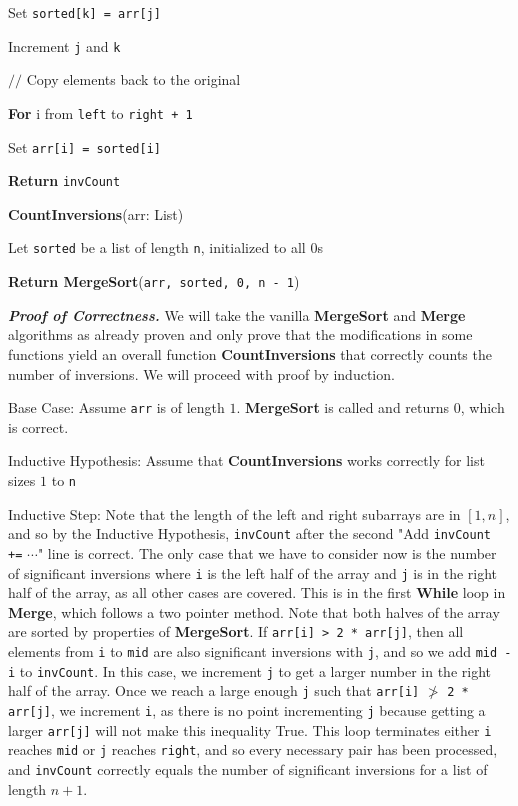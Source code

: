 \documentclass[11pt]{article}
\begin{document}
\begin{enumerate}[leftmargin=*,start=0]
\hspace{15mm} Set \verb|sorted[k] = arr[j]|

\hspace{15mm} Increment \verb|j| and \verb|k|

\hspace{5mm} $//$ Copy elements back to the original

\hspace{5mm} \textbf{For} i from \verb|left| to \verb|right + 1|

\hspace{10mm} Set \verb|arr[i] = sorted[i]|

\hspace{5mm} \textbf{Return} \verb|invCount|

\hfill

\textbf{CountInversions}(arr: List)

\hspace{5mm} Let \verb|sorted| be a list of length \verb|n|, initialized to all $0$s

\hspace{5mm} \textbf{Return MergeSort}(\verb|arr, sorted, 0, n - 1|)

\hfill

\textbf{\textit{Proof of Correctness.}} We will take the vanilla \textbf{MergeSort} and \textbf{Merge}
algorithms as already proven and only prove that the modifications in some functions yield an overall function
\textbf{CountInversions} that correctly counts the number of inversions. We will proceed with proof by induction. 

Base Case: Assume \verb|arr| is of length $1$. \textbf{MergeSort} is called and returns $0$, which is correct.

Inductive Hypothesis: Assume that \textbf{CountInversions} works correctly for list sizes $1$ to \verb|n|

Inductive Step: Note that the length of the left and right subarrays are in $[1, n]$, and so by the Inductive Hypothesis, 
\verb|invCount| after the second "Add \verb|invCount +=| $\cdots$" line is correct. The only case that we have to consider now is the number 
of significant inversions where \verb|i| is the left half of the array and \verb|j| is in the right half of the array, as all 
other cases are covered. This is in the first \textbf{While} loop in \textbf{Merge}, which follows a two pointer method. Note that both 
halves of the array are sorted by properties of \textbf{MergeSort}. If \verb|arr[i] > 2 * arr[j]|, then all elements from \verb|i|
to \verb|mid| are also significant inversions with \verb|j|, and so we add \verb|mid - i| to \verb|invCount|. In this case, we increment \verb|j| to get a
larger number in the right half of the array. Once we reach a large enough \verb|j| such that \verb|arr[i]| $\not >$ \verb|2 * arr[j]|, 
we increment \verb|i|, as there is no point incrementing \verb|j| because getting a larger \verb|arr[j]| will not make this inequality True.
This loop terminates either \verb|i| reaches \verb|mid| or \verb|j| reaches \verb|right|, and so every necessary pair has been processed, and 
\verb|invCount| correctly equals the number of significant inversions for a list of length $n + 1$. 



\end{enumerate}
\end{document}
